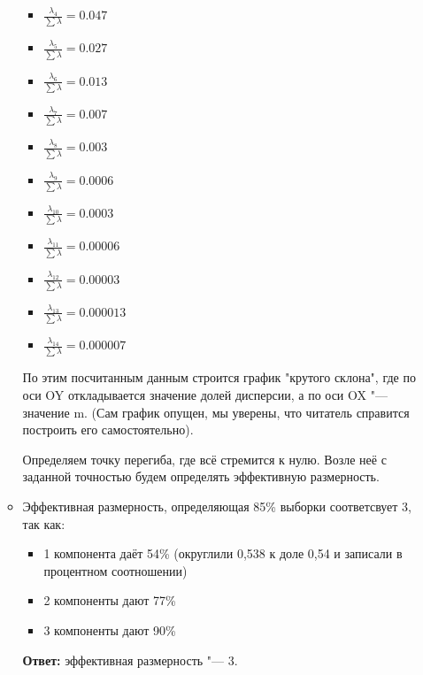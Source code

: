 \begin{enumerate}
\begin{itemize}
\begin{itemize}
                        \item $\frac{ \lambda_4 }{\sum \lambda}  = 0.047$
                        \item $\frac{ \lambda_5 }{\sum \lambda}  = 0.027$
                        \item $\frac{ \lambda_6 }{\sum \lambda} = 0.013$
                        \item $\frac{ \lambda_7 }{\sum \lambda}  = 0.007$
                        \item $\frac{ \lambda_8 }{\sum \lambda}  = 0.003$
                        \item $\frac{ \lambda_9 }{\sum \lambda}  = 0.0006$
                        \item $\frac{ \lambda_{10} }{\sum \lambda} = 0.0003$
                        \item $\frac{ \lambda_{11} }{\sum \lambda} = 0.00006$
                        \item $\frac{ \lambda_{12}}{\sum \lambda} = 0.00003$
                        \item $\frac{ \lambda_{13} }{\sum \lambda} = 0.000013$
                        \item $\frac{ \lambda_{14} }{\sum \lambda} = 0.000007$
                    \end{itemize} \par
                    По этим посчитанным данным строится график "крутого склона", где по оси OY откладывается значение долей дисперсии, а по оси OX "--- значение m. (Сам график опущен, мы уверены, что читатель справится построить его самостоятельно). \par
                    Определяем точку перегиба, где всё стремится к нулю. Возле неё с заданной точностью будем определять эффективную размерность.
              \item Эффективная размерность, определяющая 85\% выборки соответсвует 3, так как: \par
                    \begin{itemize}
                        \item 1 компонента даёт 54\% (округлили 0,538 к доле 0,54 и записали в процентном соотношении)
                        \item 2 компоненты дают 77\%
                        \item 3 компоненты дают 90\%
                    \end{itemize}\par
                    \textbf{Ответ:} эффективная размерность "--- 3.
          \end{itemize}

\end{enumerate}


